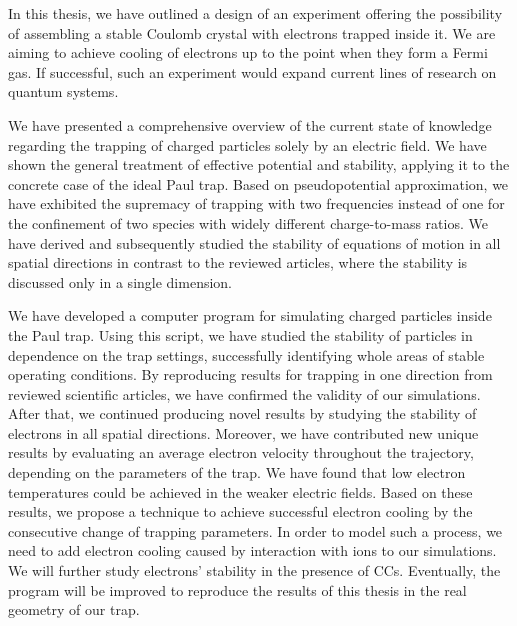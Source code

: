 
In this thesis, we have outlined a design of an experiment offering the possibility of assembling a stable Coulomb crystal with electrons trapped inside it. We are aiming to achieve cooling of electrons up to the point when they form a Fermi gas. If successful, such an experiment would expand current lines of research on quantum systems. 

We have presented a comprehensive overview of the current state of knowledge regarding the trapping of charged particles solely by an electric field. We have shown the general treatment of effective potential and stability, applying it to the concrete case of the ideal Paul trap. Based on pseudopotential approximation, we have exhibited the supremacy of trapping with two frequencies instead of one for the confinement of two species with widely different charge-to-mass ratios. We have derived and subsequently studied the stability of equations of motion in all spatial directions in contrast to the reviewed articles, where the stability is discussed only in a single dimension.

We have developed a computer program for simulating charged particles inside the Paul trap. Using this script, we have studied the stability of particles in dependence on the trap settings, successfully identifying whole areas of stable operating conditions. By reproducing results for trapping in one direction from reviewed scientific articles, we have confirmed the validity of our simulations. After that, we continued producing novel results by studying the stability of electrons in all spatial directions. Moreover, we have contributed new unique results by evaluating an average electron velocity throughout the trajectory, depending on the parameters of the trap. We have found that low electron temperatures could be achieved in the weaker electric fields. Based on these results, we propose a technique to achieve successful electron cooling by the consecutive change of trapping parameters. In order to model such a process, we need to add electron cooling caused by interaction with ions to our simulations. We will further study electrons' stability in the presence of CCs. Eventually, the program will be improved to reproduce the results of this thesis in the real geometry of our trap. 
